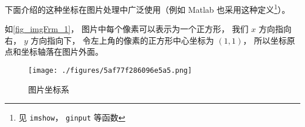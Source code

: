 
下面介绍的这种坐标在图片处理中广泛使用（例如 Matlab 也采用这种定义\footnote{见 \lstinline|imshow|， \lstinline|ginput| 等函数}）。

如\autoref{fig_imgFrm_1}， 图片中每个像素可以表示为一个正方形， 我们 $x$ 方向指向右， $y$ 方向指向下， 令左上角的像素的正方形中心坐标为 $(1, 1)$， 所以坐标原点和坐标轴落在图片外面。

\begin{figure}[ht]
\centering
\texttt{[image: ./figures/5af77f286096e5a5.png]}
\caption{图片坐标系} \label{fig_imgFrm_1}
\end{figure}
